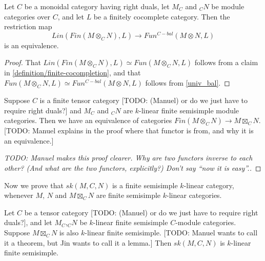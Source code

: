\begin{lemma}\label{univ_finbal}

  Let $C$ be a monoidal category having right duals, let $M_C$ and $_{C}N$ be
  module categories over $C$, and let $L$ be a finitely cocomplete category. Then the
  restriction map $$Lin(Fin(M\otimes_C N),L)\to Fun^{C-bal}(M\otimes N,L)$$ is
  an equivalence.
\end{lemma}

\begin{proof}
  That $Lin(Fin(M\otimes_C N),L) \simeq Fun(M \otimes_{C} N, L)$ follows from
  a claim in \ref{definition/finite-cocompletion}, and that
  $Fun(M \otimes_{C} N, L) \simeq Fun^{C-bal}(M \otimes N, L)$ follows from
  \ref{univ_bal}.
\end{proof}

\begin{proposition}\label{fin_eq_bal}

  Suppose $C$ is a finite tensor category [TODO: (Manuel) or do we just have to require right duals?]
  and $M_C$ and $_{C}N$ are $k$-linear finite
  semisimple module categories.
  Then we have an equivalence of categories $Fin(M\otimes_C N) \to M\boxtimes_C N$.
  [TODO: Manuel explains in the proof where that functor is from, and why it is an equivalence.]
\end{proposition}

\begin{proof}
  [TODO: Manuel makes this proof clearer. Why are two functors inverse to each
  other? (And what are the two functors, explicitly?) Don't say ``now it is
  easy''.]
\end{proof}

Now we prove that $sk(M,C,N)$ is a finite semisimple $k$-linear category,
whenever $M$, $N$ and $M\boxtimes_C N$ are finite semisimple $k$-linear
categories.

\begin{lemma}\label{semisimple}
  Let $C$ be a tensor category [TODO: (Manuel) or do we just have to require right duals?], and let $M_C$,$_{C}N$ be $k$-linear finite semisimple $C$-module categories. Suppose $M\boxtimes_C N$ is also $k$-linear finite semisimple. [TODO: Manuel wants to call it a theorem, but Jin wants to call it a lemma.] Then $sk(M,C,N)$ is
  $k$-linear finite semisimple.
\end{lemma}

